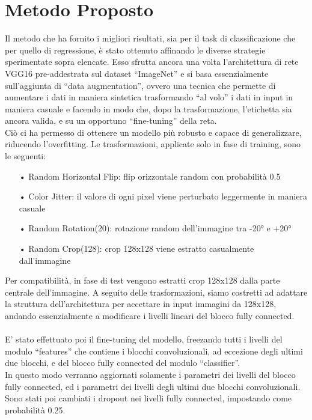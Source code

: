 \chapter{Metodo Proposto}
Il metodo che ha fornito i migliori risultati, sia per il task di classificazione che per quello di regressione, è stato ottenuto affinando le diverse strategie sperimentate sopra elencate. Esso sfrutta ancora una volta l’architettura di rete VGG16 pre-addestrata sul dataset “ImageNet” e si basa essenzialmente sull’aggiunta di “data augmentation”, ovvero una tecnica che permette di aumentare i dati in maniera sintetica trasformando “al volo” i dati in input in maniera casuale e facendo in modo che, dopo la trasformazione, l’etichetta sia ancora valida, e su un opportuno “fine-tuning” della reta.\\
Ciò ci ha permesso di ottenere un modello più robusto e capace di generalizzare, riducendo l’overfitting.
Le trasformazioni, applicate solo in fase di training, sono le seguenti:
\begin{itemize}
	\item[•]Random Horizontal Flip: flip orizzontale random con probabilità 0.5
	\item[•]Color Jitter: il valore di ogni pixel viene perturbato leggermente in maniera casuale
	\item[•]Random Rotation(20): rotazione random dell’immagine tra -20° e +20°
	\item[•]Random Crop(128): crop 128x128 viene estratto casualmente dall’immagine
\end{itemize}
Per compatibilità, in fase di test vengono estratti crop 128x128 dalla parte centrale dell’immagine.
A seguito delle trasformazioni, siamo costretti ad adattare la struttura dell’architettura per accettare in input immagini da 128x128, andando essenzialmente a modificare i livelli lineari del blocco fully connected.
\\ \\
E’ stato effettuato poi il fine-tuning del modello, freezando tutti i livelli del modulo “features” che contiene i blocchi convoluzionali, ad eccezione degli ultimi due blocchi, e del blocco fully connected del modulo “classifier”. \\
In questo modo verranno aggiornati solamente i parametri dei livelli del blocco fully connected, ed i parametri dei livelli degli ultimi due blocchi convoluzionali. \\
Sono stati poi cambiati i dropout nei livelli fully connected, impostando come probabilità 0.25.


